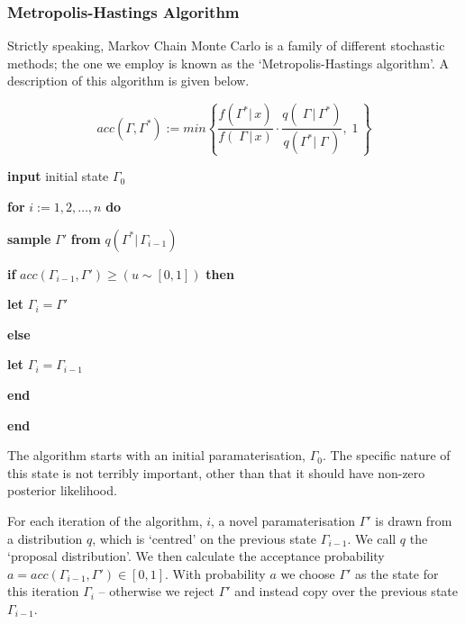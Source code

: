 \documentclass[10pt,journal,compsoc]{IEEEtran}
\begin{document}
\subsubsection{Metropolis-Hastings Algorithm}

Strictly speaking, Markov Chain Monte Carlo is a family of different stochastic methods; the one we employ is known as the `Metropolis-Hastings algorithm'. A description of this algorithm is given below.

\begin{equation*}
acc(\Gamma, \Gamma^*) := min\left\{\frac{f(\Gamma^*|\,x)}{f(\;\Gamma\,|\,x)} \cdot \frac{q(\;\Gamma\,|\,\Gamma^*)}{q(\Gamma^*|\;\Gamma\,)},\;1\,\right\}
\end{equation*}

\indent\textbf{input} initial state $\Gamma_0$

\indent\textbf{for} $i := 1, 2, \ldots , n$ \textbf{do}



\indent\indent\textbf{sample} $\Gamma'$ \textbf{from} $q(\Gamma^*|\,\Gamma_{i-1})$

\indent\indent\textbf{if} $acc(\Gamma_{i-1}, \Gamma') \ge (u \sim [0, 1])$ \textbf{then}

\indent\indent\indent\textbf{let} $\Gamma_i = \Gamma'$

\indent\indent\textbf{else}

\indent\indent\indent\textbf{let} $\Gamma_i = \Gamma_{i-1}$

\indent\indent\textbf{end}

\indent\textbf{end}

\vspace{0.5cm}

The algorithm starts with an initial paramaterisation, $\Gamma_0$. The specific nature of this state is not terribly important, other than that it should have non-zero posterior likelihood.

For each iteration of the algorithm, $i$, a novel paramaterisation $\Gamma'$ is drawn from a distribution $q$, which is `centred' on the previous state $\Gamma_{i-1}$. We call $q$ the `proposal distribution'. We then calculate the acceptance probability $a = acc(\Gamma_{i-1}, \Gamma') \in [0, 1]$. With probability $a$ we choose $\Gamma'$ as the state for this iteration $\Gamma_i$ -- otherwise we reject $\Gamma'$ and instead copy over the previous state $\Gamma_{i-1}$.
\end{document}
